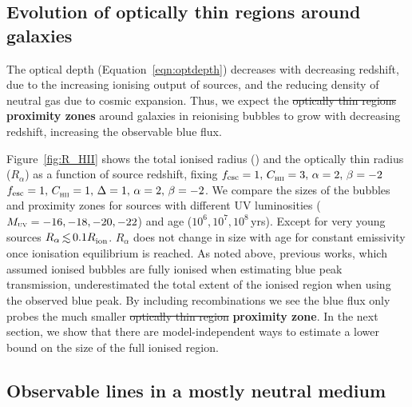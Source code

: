 \documentclass[fleqn,usenatbib]{mnras}
\providecommand{\DIFadd}[1]{{\protect\color{Green} {\bf #1}}} %
\providecommand{\DIFdel}[1]{{\protect\color{Gray} \scriptsize \sout{#1}}} %
\providecommand{\DIFaddbegin}{} %
\providecommand{\DIFaddend}{} %
\providecommand{\DIFdelbegin}{} %
\providecommand{\DIFdelend}{} %
\newcommand{\DIFscaledelfig}{0.5}
\newlength{\DIFdelgraphicswidth} %
\newlength{\DIFdelgraphicsheight} %
\newcommand{\DIFaddincludegraphics}[2][]{{\color{purple}\fbox{\DIFOincludegraphics[#1]{#2}}}} %
\newcommand{\DIFdelincludegraphics}[2][]{%
\sbox{\DIFdelgraphicsbox}{\DIFOincludegraphics[#1]{#2}}%
\settoboxwidth{\DIFdelgraphicswidth}{\DIFdelgraphicsbox} %
\settoboxtotalheight{\DIFdelgraphicsheight}{\DIFdelgraphicsbox} %
\scalebox{\DIFscaledelfig}{%
\parbox[b]{\DIFdelgraphicswidth}{\usebox{\DIFdelgraphicsbox}\\[-\baselineskip] \rule{\DIFdelgraphicswidth}{0em}}\llap{\resizebox{\DIFdelgraphicswidth}{\DIFdelgraphicsheight}{%
\setlength{\unitlength}{\DIFdelgraphicswidth}%
\begin{picture}(1,1)%
\thicklines\linethickness{2pt} %
{\color[rgb]{1,0,0}\put(0,0){\framebox(1,1){}}}%
{\color[rgb]{1,0,0}\put(0,0){\line( 1,1){1}}}%
{\color[rgb]{1,0,0}\put(0,1){\line(1,-1){1}}}%
\end{picture}%
}\hspace*{3pt}}} %
} %
\DeclareRobustCommand{\DIFaddbegin}{\DIFOaddbegin \let\includegraphics\DIFaddincludegraphics} %
\DeclareRobustCommand{\DIFaddend}{\DIFOaddend \let\includegraphics\DIFOincludegraphics} %
\DeclareRobustCommand{\DIFdelbegin}{\DIFOdelbegin \let\includegraphics\DIFdelincludegraphics} %
\DeclareRobustCommand{\DIFdelend}{\DIFOaddend \let\includegraphics\DIFOincludegraphics} %
\begin{document}
\subsection{Evolution of optically thin regions around galaxies}
\label{sec:results_opticallythin}

The \lya optical depth (Equation~\ref{eqn:optdepth}) decreases with decreasing redshift, due to the increasing ionising output of sources, and the reducing density of neutral gas due to cosmic expansion. Thus, we expect the \DIFdelbegin \DIFdel{optically thin regions }\DIFdelend \DIFaddbegin \DIFadd{proximity zones }\DIFaddend around galaxies in reionising bubbles to grow with decreasing redshift, increasing the observable blue flux.

Figure~\ref{fig:R_HII} shows the total ionised radius (\Rion) and the optically thin radius ($R_\alpha$) as a function of source redshift, fixing \DIFdelbegin \DIFdel{$\fesc=1, \, \clump=3, \, \alpha=2, \, \beta=-2$}\DIFdelend \DIFaddbegin \DIFadd{$\fesc=1, \, \clump=1, \, \Delta=1, \, \alpha=2, \, \beta=-2$}\DIFaddend . We compare the sizes of the bubbles and proximity zones for sources with different UV luminosities ($\MUV = -16, -18, -20, -22$) and age ($10^6, 10^7, 10^8$\,yrs). Except for very young sources $R_\alpha \simlt 0.1\Rion$. $R_\alpha$ does not change in size with age for constant emissivity once ionisation equilibrium is reached. 
As noted above, previous works, which assumed ionised bubbles are fully ionised when estimating blue peak transmission, underestimated the total extent of the ionised region when using the observed blue \lya peak. By including recombinations we see the blue \lya flux only probes the much smaller \DIFdelbegin \DIFdel{optically thin region}\DIFdelend \DIFaddbegin \DIFadd{proximity zone}\DIFaddend . In the next section, we show that there are model-independent ways to estimate a lower bound on the size of the full ionised region. 

\subsection{Observable \lya lines in a mostly neutral medium}
\label{sec:results_minDV}
\end{document}
